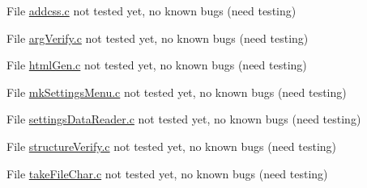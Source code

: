 
\begin{DoxyRefList}
\item[File \mbox{\hyperlink{addcss_8c}{addcss.c}} ]\label{bug__bug000001}%
%
not tested yet, no known bugs (need testing)  
\item[File \mbox{\hyperlink{argVerify_8c}{arg\+Verify.c}} ]\label{bug__bug000002}%
%
not tested yet, no known bugs (need testing)  
\item[File \mbox{\hyperlink{htmlGen_8c}{html\+Gen.c}} ]\label{bug__bug000003}%
%
not tested yet, no known bugs (need testing) 
\item[File \mbox{\hyperlink{mkSettingsMenu_8c}{mk\+Settings\+Menu.c}} ]\label{bug__bug000004}%
%
not tested yet, no known bugs (need testing)  
\item[File \mbox{\hyperlink{settingsDataReader_8c}{settings\+Data\+Reader.c}} ]\label{bug__bug000005}%
%
not tested yet, no known bugs (need testing)  
\item[File \mbox{\hyperlink{structureVerify_8c}{structure\+Verify.c}} ]\label{bug__bug000006}%
%
not tested yet, no known bugs (need testing)  
\item[File \mbox{\hyperlink{takeFileChar_8c}{take\+File\+Char.c}} ]\label{bug__bug000007}%
%
not tested yet, no known bugs (need testing) 
\end{DoxyRefList}